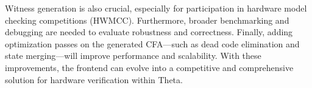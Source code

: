 Witness generation is also crucial, especially for participation in hardware model checking competitions (HWMCC). Furthermore, broader benchmarking and debugging are needed to evaluate robustness and correctness. Finally, adding optimization passes on the generated CFA—such as dead code elimination and state merging—will improve performance and scalability. With these improvements, the frontend can evolve into a competitive and comprehensive solution for hardware verification within Theta.
